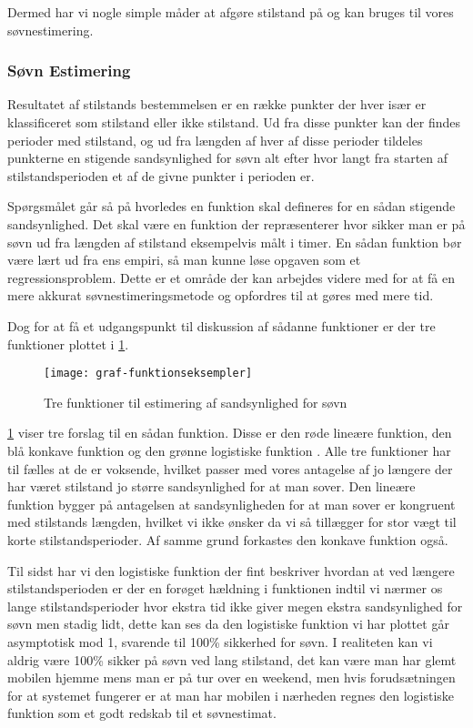Dermed har vi nogle simple måder at afgøre stilstand på og kan bruges til vores søvnestimering.
\subsubsection{Søvn Estimering}
Resultatet af stilstands bestemmelsen er en række punkter der hver især er klassificeret som stilstand eller ikke stilstand.
Ud fra disse punkter kan der findes perioder med stilstand, og ud fra længden af hver af disse perioder tildeles punkterne en stigende sandsynlighed for søvn alt efter hvor langt fra starten af stilstandsperioden et af de givne punkter i perioden er.


Spørgsmålet går så på hvorledes en funktion skal defineres for en sådan stigende sandsynlighed.
Det skal være en funktion der repræsenterer hvor sikker man er på søvn ud fra længden af stilstand eksempelvis målt i timer.
En sådan funktion bør være lært ud fra ens empiri, så man kunne løse opgaven som et regressionsproblem.
Dette er et område der kan arbejdes videre med for at få en mere akkurat søvnestimeringsmetode og opfordres til at gøres med mere tid.

Dog for at få et udgangspunkt til diskussion af sådanne funktioner er der tre funktioner plottet i \cref{fig:trefunc}.
\begin{figure}[h]
	\centering
	\texttt{[image: graf-funktionseksempler]}
	\caption{Tre funktioner til estimering af sandsynlighed for søvn}\label{fig:trefunc}
\end{figure}

\cref{fig:trefunc} viser tre forslag til en sådan funktion.
Disse er den røde lineære funktion, den blå konkave funktion og den grønne logistiske funktion \citep{wiki:LogisticFunction}.
Alle tre funktioner har til fælles at de er voksende, hvilket passer med vores antagelse af jo længere der har været stilstand jo større sandsynlighed for at man sover.
Den lineære funktion bygger på antagelsen at sandsynligheden for at man sover er kongruent med stilstands længden, hvilket vi ikke ønsker da vi så tillægger for stor vægt til korte stilstandsperioder.
Af samme grund forkastes den konkave funktion også.

Til sidst har vi den logistiske funktion der fint beskriver hvordan at ved længere stilstandsperioden er der en forøget hældning i funktionen indtil vi nærmer os lange stilstandsperioder hvor ekstra tid ikke giver megen ekstra sandsynlighed for søvn men stadig lidt, dette kan ses da den logistiske funktion vi har plottet går asymptotisk mod 1, svarende til 100\% sikkerhed for søvn.
I realiteten kan vi aldrig være 100\% sikker på søvn ved lang stilstand, det kan være man har glemt mobilen hjemme mens man er på tur over en weekend, men hvis forudsætningen for at systemet fungerer er at man har mobilen i nærheden regnes den logistiske funktion som et godt redskab til et søvnestimat.

